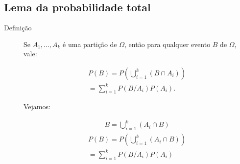    \subsection{Lema da probabilidade total}
   \begin{description}
     \item [Definição] Se $A_1,\ldots, A_k$ é uma partição de $\Omega$, então para qualquer evento $B$ de $\Omega$, vale:

       \begin{align}
         P(B)=P\left( \bigcup \limits^k_{i=1} \left(B \cap A_i \right) \right)\\ \nonumber
         = \sum^k_{i=1} P(B/A_i)P(A_i).
       \end{align}

       Vejamos: 

       \begin{align}
         B=  \bigcup \limits_{i=1}^k \left(A_i \cap B \right) 
       \end{align}
       \begin{align}
         P(B)=P \left(\bigcup \limits_{i=1}^k \left(A_i \cap B\right)\right) \\ \nonumber
         = \sum \limits_{i=1}^k P(B/A_i)P(A_i)
       \end{align}
   \end{description}
